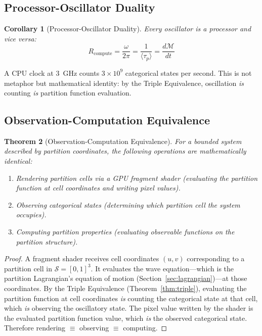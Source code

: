 \documentclass[11pt,twocolumn,a4paper]{article}
\newtheorem{theorem}{Theorem}[section]
\newtheorem{corollary}[theorem]{Corollary}
\theoremstyle{definition}
\theoremstyle{remark}
\newcommand{\Sspace}{\mathcal{S}}
\newcommand{\Depth}{\mathcal{M}}
\newcommand{\taup}{\tau_p}
\begin{document}
\subsection{Processor-Oscillator Duality}

\begin{corollary}[Processor-Oscillator Duality]
\label{cor:processor}
Every oscillator is a processor and vice versa:
\begin{equation}
R_{\mathrm{compute}} = \frac{\omega}{2\pi} = \frac{1}{\langle\taup\rangle} = \frac{d\Depth}{dt}
\end{equation}
\end{corollary}

A CPU clock at 3~GHz counts $3\times 10^9$ categorical states per second. This is not metaphor but mathematical identity: by the Triple Equivalence, oscillation \emph{is} counting \emph{is} partition function evaluation.

\subsection{Observation-Computation Equivalence}

\begin{theorem}[Observation-Computation Equivalence]
\label{thm:obs_comp}
For a bounded system described by partition coordinates, the following operations are mathematically identical:
\begin{enumerate}[nosep]
\item \emph{Rendering} partition cells via a GPU fragment shader (evaluating the partition function at cell coordinates and writing pixel values).
\item \emph{Observing} categorical states (determining which partition cell the system occupies).
\item \emph{Computing} partition properties (evaluating observable functions on the partition structure).
\end{enumerate}
\end{theorem}

\begin{proof}
A fragment shader receives cell coordinates $(u, v)$ corresponding to a partition cell in $\Sspace = [0,1]^3$. It evaluates the wave equation---which is the partition Lagrangian's equation of motion (Section~\ref{sec:lagrangian})---at those coordinates. By the Triple Equivalence (Theorem~\ref{thm:triple}), evaluating the partition function at cell coordinates \emph{is} counting the categorical state at that cell, which \emph{is} observing the oscillatory state. The pixel value written by the shader is the evaluated partition function value, which \emph{is} the observed categorical state. Therefore rendering $\equiv$ observing $\equiv$ computing.
\end{proof}
\end{document}
